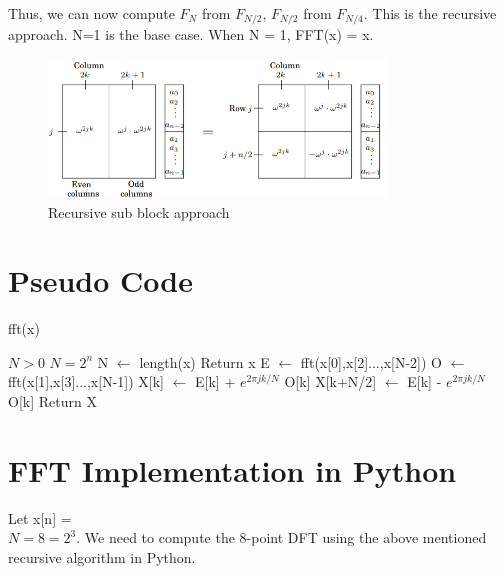 \documentclass[journal,12pt,twocolumn]{IEEEtran}
\begin{document}
Thus, we can now compute $F_N$ from $F_{N/2}$, $F_{N/2}$ from $F_{N/4}$. This is the recursive approach. N=1 is the base case. 
When N = 1, FFT(x) = x.
\begin{figure}[!ht]
    \centering
    \includegraphics[width=9cm]{./figs/subblock.png}
    \caption{Recursive sub block approach}
    \label{fig:fig1}
\end{figure}
\section{Pseudo Code}
\begin{algorithm}
\caption{fft(x)}
\begin{algorithmic} 
\REQUIRE $N > 0$
\ENSURE $N = 2^n$
\STATE N $\leftarrow$ length(x)
\STATE Return x
\ELSE
\STATE E $\leftarrow$ fft(x[0],x[2]...,x[N-2])
\STATE O $\leftarrow$ fft(x[1],x[3]...,x[N-1])
\STATE X[k] $\leftarrow$ E[k] + $e^{2\pi jk/N}$ O[k]
\STATE X[k+N/2] $\leftarrow$ E[k] - $e^{2\pi jk/N}$ O[k]
\ENDWHILE
\STATE Return X
\ENDIF
\end{algorithmic}
\end{algorithm}

\section{FFT Implementation in Python}

 Let x[n] = \\
$N = 8 = 2^3$. We need to compute the 8-point DFT using the above mentioned recursive algorithm in Python. 
\end{document}
